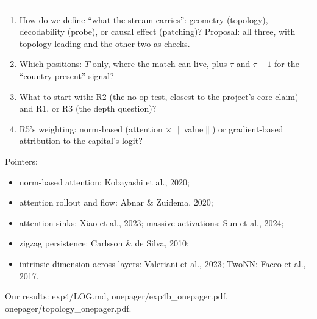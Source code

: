 \documentclass[10pt]{article}
\newcommand{\head}[1]{\par\vspace{5pt}{\large\bfseries #1}\\[-4pt]\rule{\linewidth}{0.5pt}\par}
\begin{document}
\head{To decide together}
\begin{enumerate}[leftmargin=1.4em]
\item How do we define ``what the stream carries'': geometry (topology), decodability (probe), or causal effect
  (patching)? Proposal: all three, with topology leading and the other two as checks.
\item Which positions: $T$ only, where the match can live, plus $\tau$ and $\tau{+}1$ for the ``country present''
  signal?
\item What to start with: R2 (the no-op test, closest to the project's core claim) and R1, or R3 (the depth question)?
\item R5's weighting: norm-based (attention $\times$ $\lVert$value$\rVert$) or gradient-based attribution to the
  capital's logit?
\end{enumerate}

{\footnotesize\color{muted} Pointers:
\begin{itemize}
\item norm-based attention: Kobayashi et al., 2020;
\item attention rollout and flow: Abnar \& Zuidema, 2020;
\item attention sinks: Xiao et al., 2023; massive activations: Sun et al., 2024;
\item zigzag persistence: Carlsson \& de Silva, 2010;
\item intrinsic dimension across layers: Valeriani et al., 2023; TwoNN: Facco et al., 2017.
\end{itemize}
Our results: exp4/LOG.md, onepager/exp4b\_onepager.pdf, onepager/topology\_onepager.pdf.}
\end{document}
